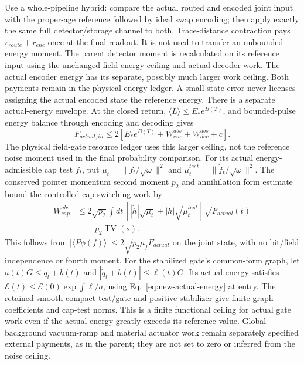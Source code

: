 Use a whole-pipeline hybrid: compare the actual routed and encoded joint
input with the proper-age reference followed by ideal swap encoding;
then apply exactly the same full detector/storage channel to both.
Trace-distance contraction pays \(r_{route}+r_{enc}\) once at the final
readout. It is not used to transfer an unbounded energy moment.
The parent detector moment is recalculated on its reference input using
the unchanged field-energy ceiling and actual decoder work. The actual
encoder energy has its separate, possibly much larger work ceiling.
Both payments remain in the physical energy ledger. A small state error
never licenses assigning the actual encoded state the reference energy.
There is a separate actual-energy envelope. At the closed return,
\(\langle L\rangle\leq E_*e^{B(T)}\), and bounded-pulse energy balance
through encoding and decoding gives
\begin{equation}
 F_{actual,in}\leq2\left[E_*e^{B(T)}
       +W_{enc}^{abs}+W_{dec}^{abs}+c\right].
 \label{eq:new-actual-energy}
\end{equation}
The physical field-gate resource ledger uses this larger ceiling, not
the reference noise moment used in the final probability comparison.
For its actual energy-admissible cap test \(f_t\), put
\(\mu_t=\|f_t/\sqrt\omega\|^2\) and
\(\dot\mu_t^{test}=\|\dot f_t/\sqrt\omega\|^2\).
The conserved pointer momentum second moment \(p_2\) and annihilation
form estimate bound the controlled cap switching work by
\[
 \begin{aligned} W_{cap}^{abs}&\leq2\sqrt{p_2}\int dt\,
  [|\dot h|\sqrt{\mu_t}+|h|\sqrt{\dot\mu_t^{test}}]
       \sqrt{F_{actual}(t)}\\ &\quad+p_2\operatorname{TV}(s).\end{aligned}
\]
This follows from \(|\langle P\phi(f)\rangle|
\leq2\sqrt{p_2\mu_f F_{actual}}\) on the joint state, with no
bit/field independence or fourth moment. For the stabilized gate's
common-form graph, let
\(a(t)G\leq q_t+b(t)\) and
\(|\dot q_t+\dot b(t)|\leq\ell(t)G\). Its actual energy satisfies
\(\mathcal E(t)\leq\mathcal E(0)\exp\int\ell/a\), using
Eq.~\eqref{eq:new-actual-energy} at entry. The retained smooth compact
test/gate and positive stabilizer give finite graph coefficients and
cap-test norms. This is a finite functional ceiling for actual gate work
even if the actual energy greatly exceeds its reference value. Global
background vacuum-ramp and material actuator work remain separately
specified external payments, as in the parent; they are not set to zero
or inferred from the noise ceiling.

